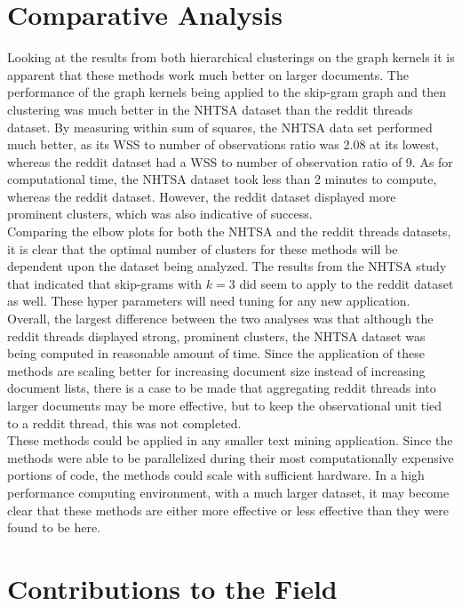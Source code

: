 \section{Comparative Analysis}

Looking at the results from both hierarchical clusterings on the graph kernels it is apparent that these methods work much better on larger documents. The performance of the graph kernels being applied to the skip-gram graph and then clustering was much better in the NHTSA dataset than the reddit threads dataset. By measuring within sum of squares, the NHTSA data set performed much better, as its WSS to number of observations ratio was 2.08 at its lowest, whereas the reddit dataset had a WSS to number of observation ratio of 9. 
As for computational time, the NHTSA dataset took less than 2 minutes to compute, whereas the reddit dataset. However, the reddit dataset displayed more prominent clusters, which was also indicative of success.\\
Comparing the elbow plots for both the NHTSA and the reddit threads datasets, it is clear that the optimal number of clusters for these methods will be dependent upon the dataset being analyzed. The results from the NHTSA study that indicated that skip-grams with $k=3$ did seem to apply to the reddit dataset as well. These hyper parameters will need tuning for any new application.\\
Overall, the largest difference between the two analyses was that although the reddit threads displayed strong, prominent clusters, the NHTSA dataset was being computed in reasonable amount of time. Since the application of these methods are scaling better for increasing document size instead of increasing document lists, there is a case to be made that aggregating reddit threads into larger documents may be more effective, but to keep the observational unit tied to a reddit thread, this was not completed.\\ 
These methods could be applied in any smaller text mining application. Since the methods were able to be parallelized during their most computationally expensive portions of code, the methods could scale with sufficient hardware. In a high performance computing environment, with a much larger dataset, it may become clear that these methods are either more effective or less effective than they were found to be here.

\section{Contributions to the Field}

